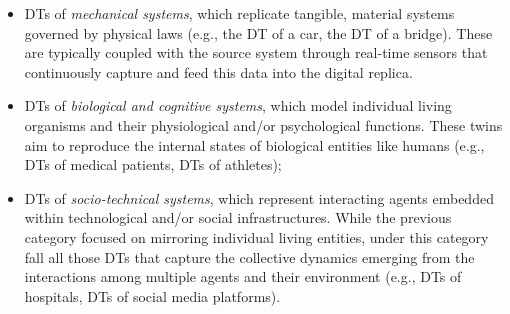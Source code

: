 \documentclass[11pt]{article}
\begin{document}
\begin{itemize}
    \item DTs of \textit{mechanical systems}, which replicate tangible, material systems governed by physical laws (e.g., the DT of a car, the DT of a bridge).
    These are typically coupled with the source system through real-time sensors that continuously capture and feed this data into the digital replica.
    \item DTs of \textit{biological and cognitive systems}, which model individual living organisms and their physiological and/or psychological functions. 
    These twins aim to reproduce the internal states of biological entities like humans (e.g., DTs of medical patients, DTs of athletes);
    \item DTs of \textit{socio-technical systems}, which represent interacting agents embedded within technological and/or social infrastructures. 
    While the previous category focused on mirroring individual living entities, under this category fall all those DTs that capture the collective dynamics emerging from the interactions among multiple agents and their environment (e.g., DTs of hospitals, DTs of social media platforms).
\end{itemize}
\end{document}
